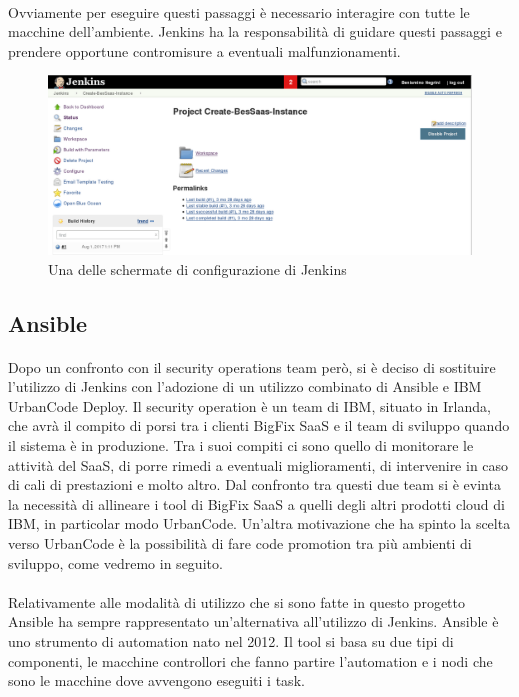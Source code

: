 \paragraph{}
Ovviamente per eseguire questi passaggi è necessario interagire con tutte le macchine dell'ambiente. Jenkins ha la responsabilità di guidare questi passaggi e prendere opportune contromisure a eventuali malfunzionamenti. 
\begin{figure}[h]
	\centering
	\includegraphics[width=0.7\linewidth]{capitoli/imgs/jenkisProj}
	\caption{Una delle schermate di configurazione di Jenkins}
	\label{fig:jenkisproj}
\end{figure}

\subsection{Ansible}
\paragraph{}
Dopo un confronto con il security operations team però, si è deciso di sostituire l'utilizzo di Jenkins con l'adozione di un utilizzo combinato di Ansible e IBM UrbanCode Deploy. Il security operation è un team di IBM, situato in Irlanda, che avrà il compito di porsi tra i clienti BigFix SaaS e il team di sviluppo quando il sistema è in produzione. Tra i suoi compiti ci sono quello di monitorare le attività del SaaS, di porre rimedi a eventuali miglioramenti, di intervenire in caso di cali di prestazioni e molto altro. Dal confronto tra questi due team si è evinta la necessità di allineare i tool di BigFix SaaS a quelli degli altri prodotti cloud di IBM, in particolar modo UrbanCode. Un'altra motivazione che ha spinto la scelta verso UrbanCode è la possibilità di fare code promotion tra più ambienti di sviluppo, come vedremo in seguito. 
\paragraph{}
Relativamente alle modalità di utilizzo che si sono fatte in questo progetto Ansible ha sempre rappresentato un'alternativa all'utilizzo di Jenkins. Ansible è uno strumento di automation nato nel 2012. Il tool si basa su due tipi di componenti, le macchine controllori che fanno partire l'automation e i nodi che sono le macchine dove avvengono eseguiti i task. 
